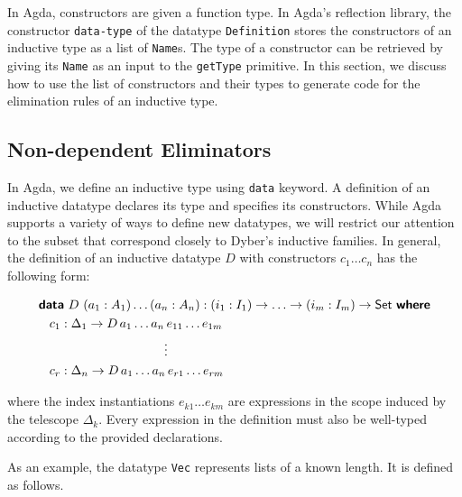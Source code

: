\documentclass[runningheads]{llncs}
\begin{document}
In Agda, constructors are given a function type. In Agda's reflection library, the constructor {\tt data-type} of the datatype {\tt Definition} stores the constructors of an inductive type as a list of \texttt{Name}s. The type of a constructor can be retrieved by giving its {\tt Name} as an input to the {\tt getType} primitive. In this section, we discuss how to use the list of constructors and their types to generate code for the elimination rules of an inductive type.

\subsection{Non-dependent Eliminators}
\label{sec:sec3.1}

\newcommand*{\KW}[1]{\textsf{\textbf{#1}}}
\newcommand*{\SET}{\textsf{Set}}

In Agda, we define an inductive type using {\tt data} keyword. A definition of an inductive datatype declares its type and specifies its constructors.
While Agda supports a variety of ways to define new datatypes, we will restrict our attention to the subset that correspond closely to Dyber's inductive families. In general, the definition of an inductive datatype $D$ with constructors $c_1 \ldots c_n$ has the following form:
\begin{center}
\fontsize{7.9pt}{2pt}\selectfont
\begin{align*}
&\KW{data}\ D\ (a_1 : A_1) \ldots (a_n:A_n) : (i_1 : I_1) \rightarrow\ldots\rightarrow (i_m : I_m) \rightarrow \SET{}\ \KW{where}  \\
&\hspace{0.3cm} c_1 : \Delta_1 \rightarrow D \, a_1 \ldots a_n \, e_{11} \ldots e_{1m}  \\
&\hspace{3.5cm} \vdots  \\
&\hspace{0.3cm} c_r : \Delta_n \rightarrow D \, a_1 \ldots a_n \, e_{r1} \ldots e_{rm}  \\
\end{align*}
\end{center}
where the index instantiations $e_{k1} \ldots e_{km}$ are expressions in the scope induced by the telescope $\Delta_k$. Every expression in the definition must also be well-typed according to the provided declarations.

As an example, the datatype \texttt{Vec} represents lists of a known length. It is defined as follows.
\end{document}
